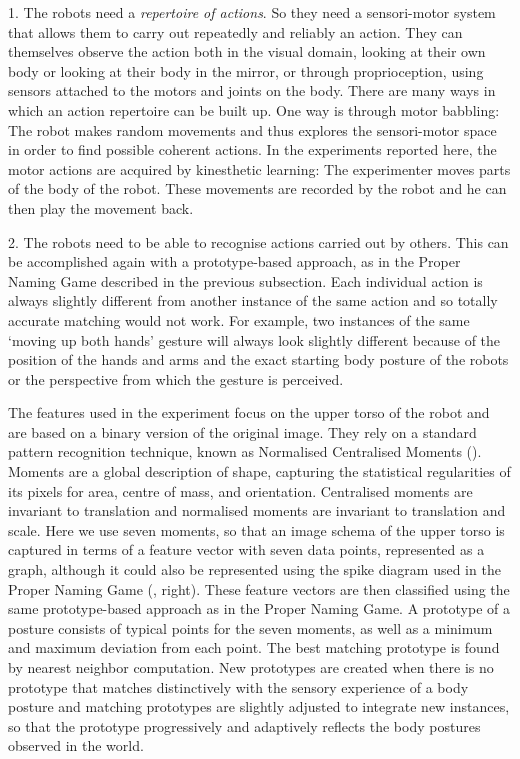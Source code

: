 1. The robots need a {\itshape repertoire of actions}. So they need a sensori-motor system that allows them to carry out 
repeatedly and reliably an action. They can themselves observe the action both in the visual domain,  
looking at their own body or looking at their body in the mirror, or through proprioception, using sensors attached 
to the motors and joints on the body. There are many ways in which an action repertoire can be built up. One way 
is through motor babbling: The robot makes random movements and thus explores the sensori-motor 
space in order to find possible coherent actions. In the experiments reported here, the motor actions are acquired 
by kinesthetic learning: The experimenter moves parts of the body of the robot. These movements are recorded by the robot
and he can then play the movement back. 

2. The robots need to be able to recognise actions carried out by others. This can be accomplished again 
with a prototype-based approach, as in the Proper Naming Game described in the previous subsection. Each individual action 
is always slightly different from another instance of the same action and so totally accurate matching would not work. 
For example, two instances of the same `moving up both hands' gesture will always look slightly different because of the 
position of the hands and arms and the exact starting body posture of the robots or the perspective from which 
the gesture is perceived. 

The features used in the experiment focus on the upper torso of the robot and are based on a binary 
version of the original image. They rely on a standard pattern recognition technique, known as Normalised 
Centralised Moments (\cite{Hu:1962}). 
Moments are a global description of shape, capturing the statistical regularities
of its pixels for area, centre of mass, and orientation. Centralised moments are invariant to translation and 
normalised moments are invariant to translation and scale. Here we use seven moments, so that an image schema of 
the upper torso is captured in terms of a feature vector with seven data points, represented as a graph, 
although it could also be represented using the spike diagram used in the Proper Naming Game (, right). 
These feature vectors are then classified using the same prototype-based approach as in the Proper Naming Game. A prototype of a posture 
consists of typical points for the seven moments, as well as a minimum and maximum deviation from 
each point. The best matching prototype is found by nearest neighbor computation. New prototypes are created 
when there is no prototype that matches distinctively with the sensory experience of a body posture and matching prototypes are
slightly adjusted to integrate new instances, so that the prototype progressively and adaptively reflects the body postures observed
in the world. 

